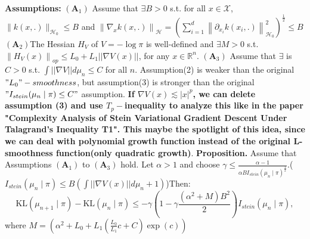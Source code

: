 \documentclass[12pt,a4paper]{article}
\begin{document}
	\textbf{Assumptions:}
	\newline
	$\left(\mathbf{A}_{1}\right)$ Assume that $\exists B>0$ s.t. for all $x \in \mathcal{X}$,
	$\|k(x, .)\|_{\mathcal{H}_{0}} \leq B$ and $\left\|\nabla_{x} k(x, .)\right\|_{\mathcal{H}}=\left(\sum_{i=1}^{d}\left\|\partial_{x_{i}} k\left(x_{i}, .\right)\right\|_{\mathcal{H}_{0}}^{2}\right)^{\frac{1}{2}} \leq B$
	\newline
	$\left(\mathbf{A}_{2}\right)$The Hessian $H_{V}$ of $V=-\log \pi$ is well-defined and $\exists M>0$ s.t. $\left\|H_{V}(x)\right\|_{o p} \leq L_0+L_1||\nabla V(x)||$, for any $x\in\mathbb{R}^n$.
	\newline
	$\left(\mathbf{A}_{3}\right)$ Assume that $\exists$ is $C>0$ s.t. $\int ||\nabla V||d\mu_n\leq C$ for all $n$.
	\newline
	\newline
	Assumption(2) is weaker than the original $"L_0"-smoothness$, but assumption(3) is stronger than the original $"I_{stein}(\mu_n\mid \pi)\leq C"$ assumption. \textbf{If $\nabla V(x)\lesssim |x|^p$, we can delete assumption (3) and use $T_p-$inequality to analyze this like in the paper "Complexity Analysis of Stein Variational Gradient Descent Under Talagrand's Inequality T1". This maybe the spotlight of this idea, since we can deal with polynomial growth function instead of the original L-smoothness function(only quadratic growth)}.
	\newline
	\textbf{Proposition.} Assume that Assumptions $\left(\mathbf{A}_{1}\right)$ to $\left(\mathbf{A}_{3}\right)$ hold. Let $\alpha>1$ and choose $\gamma \leq \frac{\alpha-1}{\alpha B I_{stein}(\mu_n\mid \pi)^{\frac{1}{2}}}$.($I_{stein}(\mu_n\mid \pi)\leq B(\int ||\nabla V(x)||d\mu_n+1)$)Then:
	$$
	\mathrm{KL}\left(\mu_{n+1} \mid \pi\right)-\mathrm{KL}\left(\mu_{n} \mid \pi\right) \leq-\gamma\left(1-\gamma \frac{\left(\alpha^{2}+M\right) B^{2}}{2}\right) I_{s t e i n}\left(\mu_{n} \mid \pi\right),
	$$
	where $M= (\alpha^2 +L_{0}+L_{1}\left(\frac{L_{0}}{L_{1}} c+C\right) \exp (c))$
\end{document}

